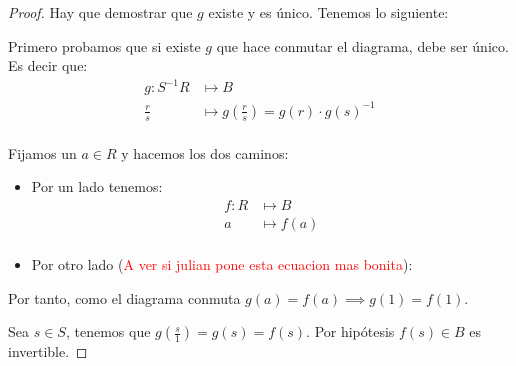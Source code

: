 	\begin{proof}
		Hay que demostrar que $g$ existe y es único. Tenemos lo siguiente:
		
		
		Primero probamos que si existe $g$ que hace conmutar el diagrama, debe ser único. Es decir que:
		\begin{align*}
			g: S^{-1}R & \longmapsto  B\\
			\frac{r}{s} & \longmapsto g\left( \frac{r}{s} \right)=g(r)\cdot g(s)^{-1} \\
		\end{align*}
		
		Fijamos un $a \in R$ y hacemos los dos caminos:
		\begin{itemize}
			\item Por un lado tenemos: \begin{align*}
				f: R & \longmapsto  B\\
				a & \longmapsto f(a) \\
			\end{align*}
			
			\item Por otro lado (\textcolor{red}{A ver si julian pone esta ecuacion mas bonita}):
			
		\end{itemize}
		
		Por tanto, como el diagrama conmuta $g(a)=f(a) \implies g(1)=f(1)$.
		
		Sea $s\in S$, tenemos que $g(\frac{s}{1})=g(s)=f(s)$. Por hipótesis $f(s) \in B$ es invertible. 
		

\end{proof}

